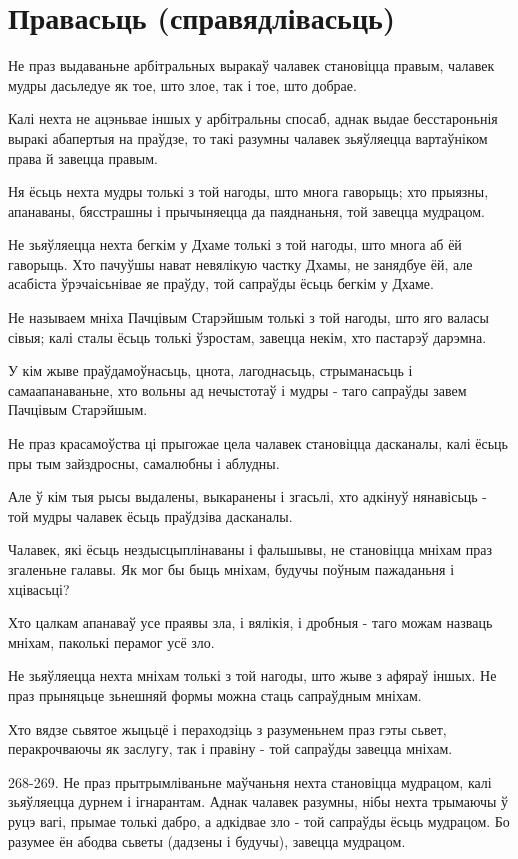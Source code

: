 \documentclass{article}
\begin{document}
\section{Правасьць (справядлівасьць)}

Не праз выдаваньне арбітральных выракаў чалавек становіцца правым,
чалавек мудры дасьледуе як тое, што злое, так і тое, што добрае.

Калі нехта не ацэньвае іншых у арбітральны спосаб, аднак выдае
бесстароньнія выракі абапертыя на праўдзе, то такі разумны чалавек
зьяўляецца вартаўніком права й завецца правым.

Ня ёсьць нехта мудры толькі з той нагоды, што многа гаворыць; хто
прыязны, апанаваны, бясстрашны і прычыняецца да паяднаньня, той завецца
мудрацом.

Не зьяўляецца нехта бегкім у Дхаме толькі з той нагоды, што многа
аб ёй гаворыць. Хто пачуўшы нават невялікую частку Дхамы, не занядбуе
ёй, але асабіста ўрэчаісьнівае яе праўду, той сапраўды ёсьць бегкім у
Дхаме.

Не называем мніха Пачцівым Старэйшым толькі з той нагоды, што яго
валасы сівыя; калі сталы ёсьць толькі ўзростам, завецца некім, хто
пастарэў дарэмна.

У кім жыве праўдамоўнасьць, цнота, лагоднасьць, стрыманасьць і
самаапанаваньне, хто вольны ад нечыстотаў і мудры - таго сапраўды завем
Пачцівым Старэйшым.

Не праз красамоўства ці прыгожае цела чалавек становіцца дасканалы,
калі ёсьць пры тым зайздросны, самалюбны і аблудны.

Але ў кім тыя рысы выдалены, выкаранены і згасьлі, хто адкінуў
нянавісьць - той мудры чалавек ёсьць праўдзіва дасканалы.

Чалавек, які ёсьць нездысцыплінаваны і фальшывы, не становіцца
мніхам праз згаленьне галавы. Як мог бы быць мніхам, будучы поўным
пажаданьня і хцівасьці?

Хто цалкам апанаваў усе праявы зла, і вялікія, і дробныя - таго
можам назваць мніхам, паколькі перамог усё зло.

Не зьяўляецца нехта мніхам толькі з той нагоды, што жыве з афяраў
іншых. Не праз прыняцьце зьнешняй формы можна стаць сапраўдным мніхам.

Хто вядзе сьвятое жыцьцё і пераходзіць з разуменьнем праз гэты
сьвет, перакрочваючы як заслугу, так і правіну - той сапраўды завецца
мніхам.

268-269. Не праз прытрымліваньне маўчаньня нехта становіцца мудрацом,
калі зьяўляецца дурнем і ігнарантам. Аднак чалавек разумны, нібы нехта
трымаючы ў руцэ вагі, прымае толькі дабро, а адкідвае зло - той сапраўды
ёсьць мудрацом. Бо разумее ён абодва сьветы (дадзены і будучы), завецца
мудрацом.
\end{document}
